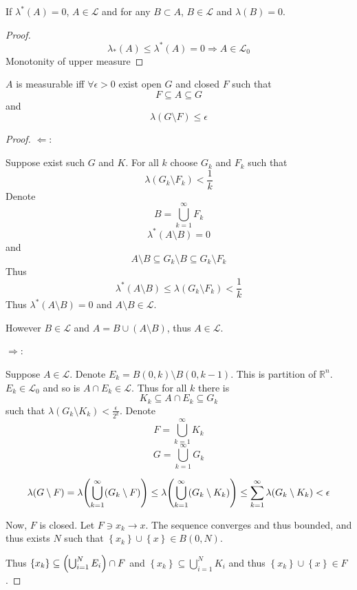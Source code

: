 \begin{prop}[]
	If $\lambda^*(A)=0 $, $A\in \mathcal{L}$ and for any $B\subset A$, $B\in \mathcal{L}$ and $\lambda(B)=0$.
	\begin{proof}
		$$\lambda_*(A) \leq \lambda^*(A) = 0 \Rightarrow A\in \mathcal{L}_0$$
		Monotonity of upper measure
	\end{proof}
\end{prop}
\begin{theorem}
	$A$ is measurable iff $\forall \epsilon>0$ exist open $G$ and closed $F$ such that $$F\subseteq A\subseteq G$$ and $$\lambda(G\setminus F) \leq \epsilon$$
	\begin{proof}
		$\Leftarrow$:
		
		Suppose exist such $G$ and $K$. For all $k$ choose 
		$G_k$ and $F_k$ such that
		$$\lambda(G_k\setminus F_k) < \frac{1}{k}$$
		Denote 
		$$B = \bigcup_{k=1}^\infty F_k$$
		$$\lambda^* (A\setminus B) = 0$$
		and
		$$A\setminus B \subseteq G_k \setminus B \subseteq G_k \setminus F_k$$
		Thus
		$$\lambda^*(A\setminus B) \leq \lambda(G_k \setminus F_k) <\frac{1}{k}$$
		Thus $\lambda^*(A\setminus B) = 0$ and $A\setminus B \in \mathcal{L}$.
		
		However $B \in \mathcal{L}$ and $A = B\cup (A\setminus B)$, thus $A\in \mathcal{L}$.
		
		
		$\Rightarrow$:
		
		Suppose $A\in \mathcal{L}$. Denote $E_k = B(0,k) \setminus B(0,k-1)$. This is partition of $\mathbb{R}^n$. $E_k \in \mathcal{L}_0$ and so is $A\cap E_k \in \mathcal{L}$. 	
		Thus for all $k$ there is
		$$K_k \subseteq A\cap E_k \subseteq G_k$$
		such that $\lambda(G_k\setminus K_k) < \frac{\epsilon}{2^k}$.
		Denote 
		$$F = \bigcup_{k=1}^\infty K_k$$
		$$G = \bigcup_{k=1}^\infty G_k$$
		
		$$\lambda(G\setminus F)= \lambda\qty(\bigcup_{k=1}^\infty (G_k\setminus F)) \leq \lambda\qty(\bigcup_{k=1}^\infty (G_k\setminus K_k)) \leq \sum_{k=1}^\infty\lambda\qty( G_k\setminus K_k) < \epsilon$$
		
		Now, $F$ is closed. Let $F \ni x_k \to x$. The sequence converges and thus bounded, and thus exists $N$ such that $\left\{ x_k \right\} \cup \left\{ x \right\} \in B(0,N)$.
		
		Thus $\left\{ x_k \right\} \subseteq \qty(\bigcup_{i=1}^N E_i) \cap F$ and $\left\{ x_k \right\} \subseteq \bigcup_{i=1}^N K_i$ and thus  $\left\{ x_k \right\} \cup \left\{ x \right\} \in F$.
		
		
		
	\end{proof}
\end{theorem}